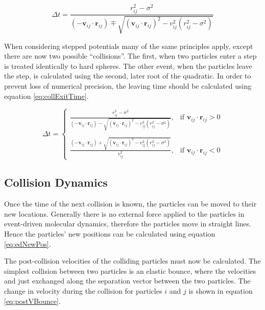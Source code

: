 \documentclass[12pt]{UoAthesis}
\begin{document}
\begin{equation}
\Delta t = \frac{r_{ij}^2 - \sigma^2}{(-\mathbf{v}_{ij}\cdot\mathbf{r}_{ij})
  \mp \sqrt{(\mathbf{v}_{ij}\cdot\mathbf{r}_{ij})^2 
    - v_{ij}^2(r_{ij}^2 - \sigma^2)}}
\label{eq:collEnterTimeAlt}
\end{equation}

When considering stepped potentials many of the same principles apply,
except there are now two possible ``collisions''. The first, when two
particles enter a step is treated identically to hard spheres. The
other event, when the particles leave the step, is calculated using
the second, later root of the quadratic.  In order to prevent loss of
numerical precision, the leaving time should be calculated using
equation \eqref{eq:collExitTime}.

\begin{equation}
  \label{eq:collExitTime}
\Delta t = 
\begin{cases}
  \frac{r_{ij}^2 - \sigma^2}{(-\mathbf{v}_{ij}\cdot\mathbf{r}_{ij})
    - \sqrt{(\mathbf{v}_{ij}\cdot\mathbf{r}_{ij})^2 
      - v_{ij}^2(r_{ij}^2 - \sigma^2)}}, & \text{if }
  \mathbf{v}_{ij}\cdot\mathbf{r}_{ij} > 0 \\
\\

\frac{(-\mathbf{v}_{ij}\cdot\mathbf{r}_{ij}) +
  \sqrt{(\mathbf{v}_{ij}\cdot\mathbf{r}_{ij})^2 - v_{ij}^2(r_{ij}^2 - \sigma^2)}}
     {v_{ij}^2} , & \text{if }
     \mathbf{v}_{ij}\cdot\mathbf{r}_{ij} < 0 
\end{cases}
\end{equation}

\subsection{Collision Dynamics \label{sec:CollDyn}}
Once the time of the next collision is known, the particles can be moved
to their new locations.  Generally there is no external force applied
to the particles in event-driven molecular dynamics, therefore the
particles move in straight lines.  Hence the particles' new positions
can be calculated using equation \eqref{eq:edNewPos}.



The post-collision velocities of the colliding particles must now be
calculated.  The simplest collision between two particles is an
elastic bounce, where the velocities and just exchanged along the
separation vector between the two particles.  The change in velocity
during the collision for particles $i$ and $j$ is shown in equation
\eqref{eq:postVBounce}.
\end{document}
